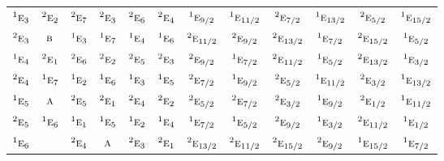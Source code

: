 \documentclass[10pt,a4paper]{article}
\numberwithin{equation}{section}
\newcommand{\irr}[1]{\text{\normalfont\scshape #1}}
\newcommand{\conjpair}[1]{{}^{#1}}
\begin{document}
{\begin{longtable}{@{}lccccccccccc@{}}
$\conjpair{1}\irr{e}_{3}$ & $\conjpair{2}\irr{e}_{2}$ & $\conjpair{2}\irr{e}_{7}$ & $\conjpair{2}\irr{e}_{3}$ & $\conjpair{2}\irr{e}_{6}$ & $\conjpair{2}\irr{e}_{4}$ & $\conjpair{1}\irr{e}_{9/2}$ & $\conjpair{1}\irr{e}_{11/2}$ & $\conjpair{2}\irr{e}_{7/2}$ & $\conjpair{1}\irr{e}_{13/2}$ & $\conjpair{2}\irr{e}_{5/2}$ & $\conjpair{1}\irr{e}_{15/2}$\\
$\conjpair{2}\irr{e}_{3}$ & $\irr{b}$ & $\conjpair{1}\irr{e}_{3}$ & $\conjpair{1}\irr{e}_{7}$ & $\conjpair{1}\irr{e}_{4}$ & $\conjpair{1}\irr{e}_{6}$ & $\conjpair{2}\irr{e}_{11/2}$ & $\conjpair{2}\irr{e}_{9/2}$ & $\conjpair{2}\irr{e}_{13/2}$ & $\conjpair{1}\irr{e}_{7/2}$ & $\conjpair{2}\irr{e}_{15/2}$ & $\conjpair{1}\irr{e}_{5/2}$\\
$\conjpair{1}\irr{e}_{4}$ & $\conjpair{2}\irr{e}_{1}$ & $\conjpair{2}\irr{e}_{6}$ & $\conjpair{2}\irr{e}_{2}$ & $\conjpair{2}\irr{e}_{5}$ & $\conjpair{2}\irr{e}_{3}$ & $\conjpair{2}\irr{e}_{9/2}$ & $\conjpair{1}\irr{e}_{7/2}$ & $\conjpair{2}\irr{e}_{11/2}$ & $\conjpair{1}\irr{e}_{5/2}$ & $\conjpair{2}\irr{e}_{13/2}$ & $\conjpair{1}\irr{e}_{3/2}$\\
$\conjpair{2}\irr{e}_{4}$ & $\conjpair{1}\irr{e}_{7}$ & $\conjpair{1}\irr{e}_{2}$ & $\conjpair{1}\irr{e}_{6}$ & $\conjpair{1}\irr{e}_{3}$ & $\conjpair{1}\irr{e}_{5}$ & $\conjpair{2}\irr{e}_{7/2}$ & $\conjpair{1}\irr{e}_{9/2}$ & $\conjpair{2}\irr{e}_{5/2}$ & $\conjpair{1}\irr{e}_{11/2}$ & $\conjpair{2}\irr{e}_{3/2}$ & $\conjpair{1}\irr{e}_{13/2}$\\
$\conjpair{1}\irr{e}_{5}$ & $\irr{a}$ & $\conjpair{2}\irr{e}_{5}$ & $\conjpair{2}\irr{e}_{1}$ & $\conjpair{2}\irr{e}_{4}$ & $\conjpair{2}\irr{e}_{2}$ & $\conjpair{2}\irr{e}_{5/2}$ & $\conjpair{2}\irr{e}_{7/2}$ & $\conjpair{2}\irr{e}_{3/2}$ & $\conjpair{1}\irr{e}_{9/2}$ & $\conjpair{2}\irr{e}_{1/2}$ & $\conjpair{1}\irr{e}_{11/2}$\\
$\conjpair{2}\irr{e}_{5}$ & $\conjpair{1}\irr{e}_{6}$ & $\conjpair{1}\irr{e}_{1}$ & $\conjpair{1}\irr{e}_{5}$ & $\conjpair{1}\irr{e}_{2}$ & $\conjpair{1}\irr{e}_{4}$ & $\conjpair{1}\irr{e}_{7/2}$ & $\conjpair{1}\irr{e}_{5/2}$ & $\conjpair{2}\irr{e}_{9/2}$ & $\conjpair{1}\irr{e}_{3/2}$ & $\conjpair{2}\irr{e}_{11/2}$ & $\conjpair{1}\irr{e}_{1/2}$\\
$\conjpair{1}\irr{e}_{6}$ &  & $\conjpair{2}\irr{e}_{4}$ & $\irr{a}$ & $\conjpair{2}\irr{e}_{3}$ & $\conjpair{2}\irr{e}_{1}$ & $\conjpair{2}\irr{e}_{13/2}$ & $\conjpair{2}\irr{e}_{11/2}$ & $\conjpair{2}\irr{e}_{15/2}$ & $\conjpair{2}\irr{e}_{9/2}$ & $\conjpair{1}\irr{e}_{15/2}$ & $\conjpair{1}\irr{e}_{7/2}$\\

\end{longtable}}
\end{document}
